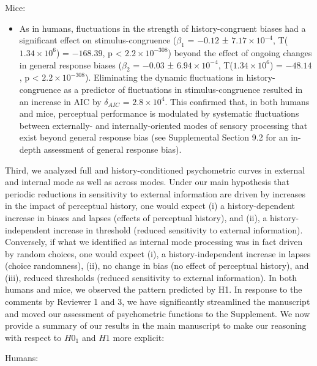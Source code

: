 \documentclass[
]{article}
\providecommand{\tightlist}{%
  \setlength{\itemsep}{0pt}\setlength{\parskip}{0pt}}
\begin{document}
Mice:

\begin{itemize}
\tightlist
\item
  As in humans, fluctuations in the strength of history-congruent biases
  had a significant effect on stimulus-congruence (\(\beta_1\) =
  \(-0.12\) ± \(\ensuremath{7.17\times 10^{-4}}\),
  T(\(\ensuremath{1.34\times 10^{6}}\)) = \(-168.39\), p < \(\ensuremath{2.2\times 10^{-308}}\)) beyond
  the effect of ongoing changes in general response biases (\(\beta_2\)
  = \(-0.03\) ± \(\ensuremath{6.94\times 10^{-4}}\),
  T(\(\ensuremath{1.34\times 10^{6}}\)) = \(-48.14\), p < \(\ensuremath{2.2\times 10^{-308}}\)).
  Eliminating the dynamic fluctuations in history-congruence as a
  predictor of fluctuations in stimulus-congruence resulted in an
  increase in AIC by \(\delta_{AIC}\) =
  \(\ensuremath{2.8\times 10^{4}}\). This confirmed that, in both humans
  and mice, perceptual performance is modulated by systematic
  fluctuations between externally- and internally-oriented modes of
  sensory processing that exist beyond general response bias (see
  Supplemental Section 9.2 for an in-depth assessment of general
  response bias).
\end{itemize}

Third, we analyzed full and history-conditioned psychometric curves in
external and internal mode as well as across modes. Under our main
hypothesis that periodic reductions in sensitivity to external
information are driven by increases in the impact of perceptual history,
one would expect (i) a history-dependent increase in biases and lapses
(effects of perceptual history), and (ii), a history-independent
increase in threshold (reduced sensitivity to external information).
Conversely, if what we identified as internal mode processing was in
fact driven by random choices, one would expect (i), a
history-independent increase in lapses (choice randomness), (ii), no
change in bias (no effect of perceptual history), and (iii), reduced
thresholds (reduced sensitivity to external information). In both humans
and mice, we observed the pattern predicted by H1. In response to the
comments by Reviewer 1 and 3, we have significantly streamlined the
manuscript and moved our assessment of psychometric functions to the
Supplement. We now provide a summary of our results in the main
manuscript to make our reasoning with respect to \(H0_1\) and \(H1\)
more explicit:

Humans:
\end{document}
